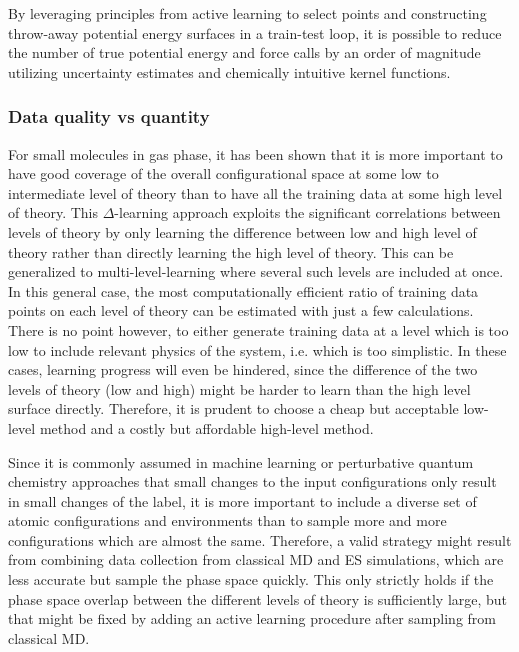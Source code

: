 \documentclass[9pt,bestpractices]{livecoms}
\begin{document}
By leveraging principles from active learning to select points and constructing
throw-away potential energy surfaces in a train-test loop, it is possible to
reduce the number of true potential energy and force calls by an order of
magnitude utilizing uncertainty estimates and chemically intuitive kernel
functions\cite{koistinenMinimumModeSaddle2020,koistinenNudgedElasticBand2019}.

\subsubsection{Data quality vs quantity}
For small molecules in gas phase, it has been shown that it is more important to have good coverage of the overall configurational space at some low to intermediate level of theory than to have all the training data at some high level of theory\cite{ramakrishnanBigDataMeets2015}. This $\Delta$-learning approach exploits the significant correlations between levels of theory by only learning the difference between low and high level of theory rather than directly learning the high level of theory. This can be generalized to multi-level-learning where several such levels are included at once. In this general case, the most computationally efficient ratio of training data points on each level of theory can be estimated with just a few calculations\cite{TODO}. There is no point however, to either generate training data at a level which is too low to include relevant physics of the system, i.e. which is too simplistic. In these cases, learning progress will even be hindered, since the difference of the two levels of theory (low and high) might be harder to learn than the high level surface directly. Therefore, it is prudent to choose a cheap but acceptable low-level method and a costly but affordable high-level method.

Since it is commonly assumed in machine learning or perturbative quantum chemistry approaches\cite{tamayo-mendozaAutomaticDifferentiationQuantum2018b,abbottArbitraryOrderDerivativesQuantum2021,vonrudorffArbitrarilyAccurateQuantum2021} that small changes to the input configurations only result in small changes of the label, it is more important to include a diverse set of atomic configurations and environments than to sample more and more configurations which are almost the same. Therefore, a valid strategy might result from combining
data collection from classical MD and ES simulations, which are less accurate but
sample the phase space quickly. This only strictly holds if the phase space overlap between the different levels of theory is sufficiently large, but that might be fixed by adding an active learning procedure after sampling from classical MD.
\end{document}
